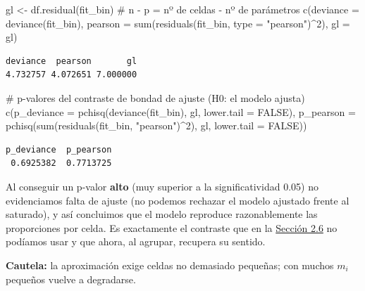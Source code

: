\documentclass[
  letterpaper,
  DIV=11,
  numbers=noendperiod]{scrartcl}
\newenvironment{Shaded}{\begin{snugshade}}{\end{snugshade}}
\newcommand{\AttributeTok}[1]{\textcolor[rgb]{0.40,0.45,0.13}{#1}}
\newcommand{\CommentTok}[1]{\textcolor[rgb]{0.37,0.37,0.37}{#1}}
\newcommand{\ConstantTok}[1]{\textcolor[rgb]{0.56,0.35,0.01}{#1}}
\newcommand{\DecValTok}[1]{\textcolor[rgb]{0.68,0.00,0.00}{#1}}
\newcommand{\FunctionTok}[1]{\textcolor[rgb]{0.28,0.35,0.67}{#1}}
\newcommand{\NormalTok}[1]{\textcolor[rgb]{0.00,0.23,0.31}{#1}}
\newcommand{\OtherTok}[1]{\textcolor[rgb]{0.00,0.23,0.31}{#1}}
\newcommand{\SpecialCharTok}[1]{\textcolor[rgb]{0.37,0.37,0.37}{#1}}
\newcommand{\StringTok}[1]{\textcolor[rgb]{0.13,0.47,0.30}{#1}}
\begin{document}
\begin{Shaded}
\begin{Highlighting}[]
\NormalTok{gl }\OtherTok{\textless{}{-}} \FunctionTok{df.residual}\NormalTok{(fit\_bin)                       }\CommentTok{\# n {-} p = nº de celdas {-} nº de parámetros}
\FunctionTok{c}\NormalTok{(}\AttributeTok{deviance =} \FunctionTok{deviance}\NormalTok{(fit\_bin),}
  \AttributeTok{pearson  =} \FunctionTok{sum}\NormalTok{(}\FunctionTok{residuals}\NormalTok{(fit\_bin, }\AttributeTok{type =} \StringTok{"pearson"}\NormalTok{)}\SpecialCharTok{\^{}}\DecValTok{2}\NormalTok{),}
  \AttributeTok{gl       =}\NormalTok{ gl)}
\end{Highlighting}
\end{Shaded}

\begin{verbatim}
deviance  pearson       gl 
4.732757 4.072651 7.000000 
\end{verbatim}

\begin{Shaded}
\begin{Highlighting}[]
\CommentTok{\# p{-}valores del contraste de bondad de ajuste (H0: el modelo ajusta)}
\FunctionTok{c}\NormalTok{(}\AttributeTok{p\_deviance =} \FunctionTok{pchisq}\NormalTok{(}\FunctionTok{deviance}\NormalTok{(fit\_bin), gl, }\AttributeTok{lower.tail =} \ConstantTok{FALSE}\NormalTok{),}
  \AttributeTok{p\_pearson  =} \FunctionTok{pchisq}\NormalTok{(}\FunctionTok{sum}\NormalTok{(}\FunctionTok{residuals}\NormalTok{(fit\_bin, }\StringTok{"pearson"}\NormalTok{)}\SpecialCharTok{\^{}}\DecValTok{2}\NormalTok{), gl, }\AttributeTok{lower.tail =} \ConstantTok{FALSE}\NormalTok{))}
\end{Highlighting}
\end{Shaded}

\begin{verbatim}
p_deviance  p_pearson 
 0.6925382  0.7713725 
\end{verbatim}

Al conseguir un p-valor \textbf{alto} (muy superior a la
significatividad 0.05) no evidenciamos falta de ajuste (no podemos
rechazar el modelo ajustado frente al saturado), y así concluimos que el
modelo reproduce razonablemente las proporciones por celda. Es
exactamente el contraste que en la
\protect\hyperlink{sec-u12-diagnostico}{Sección 2.6} no podíamos usar y
que ahora, al agrupar, recupera su sentido.

\begin{tcolorbox}[enhanced jigsaw, coltitle=black, rightrule=.15mm, arc=.35mm, leftrule=.75mm, colback=white, colbacktitle=quarto-callout-important-color!10!white, left=2mm, breakable, toptitle=1mm, toprule=.15mm, bottomtitle=1mm, titlerule=0mm, title=\textcolor{quarto-callout-important-color}{\faExclamation}\hspace{0.5em}{Importante}, bottomrule=.15mm, opacityback=0, opacitybacktitle=0.6, colframe=quarto-callout-important-color-frame]

\textbf{Cautela:} la aproximación exige celdas no demasiado pequeñas;
con muchos \(m_i\) pequeños vuelve a degradarse.

\end{tcolorbox}
\end{document}
